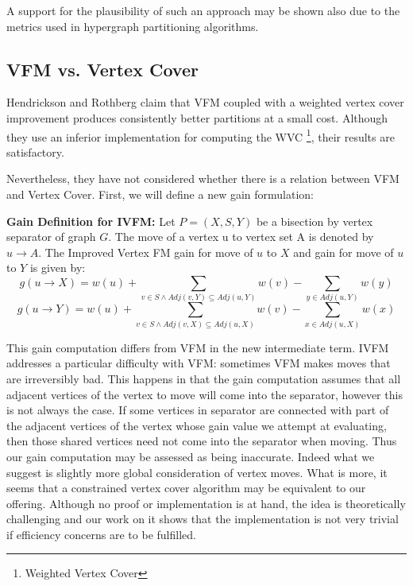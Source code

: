 \documentclass[a4paper,12pt]{article}
\begin{document}
A support for the plausibility of such an approach may be shown also
due to the metrics used in hypergraph partitioning algorithms.
\subsection{VFM vs. Vertex Cover}
Hendrickson and Rothberg claim that VFM coupled with a weighted vertex
cover improvement produces consistently better partitions at a small
cost.\cite{bend} Although they use an inferior implementation for
computing the WVC \footnote{Weighted Vertex Cover}, their results are
satisfactory.

Nevertheless, they have not considered whether there is a relation
between VFM and Vertex Cover. First, we will define a new gain
formulation:

\begin{dfn}
\textbf{Gain Definition for IVFM:} Let $P=(X,S,Y)$ be a bisection by
vertex separator of graph $G$. The move of a vertex u to vertex set A is
denoted by $u\rightarrow A$. The Improved Vertex FM gain for move
of $u$ to $X$ and gain for move of $u$ to $Y$ is given by:
\begin{equation}
g(u\rightarrow X) = w(u) +\sum_{v \in S \land Adj(v,Y) \subseteq Adj(u,Y)}{w(v)}
	 - \sum_{y \in Adj(u,Y)}{w(y)}
\end{equation}
\begin{equation}
g(u\rightarrow Y) = w(u) +\sum_{v \in S \land Adj(v,X) \subseteq Adj(u,X)}{w(v)}
	-\sum_{x \in Adj(u,X)}{w(x)}
\end{equation}
\end{dfn}

This gain computation differs from VFM in the new intermediate
term. IVFM addresses a particular difficulty with VFM: sometimes VFM
makes moves that are irreversibly bad. This happens in that the gain
computation assumes that all adjacent vertices of the vertex to move
will come into the separator, however this is not always the
case. If some vertices in separator are connected with part of the adjacent
vertices of the vertex whose gain value we attempt at evaluating, then
those shared vertices need not come into the separator when
moving. Thus our gain computation may be assessed as being
inaccurate. Indeed what we suggest is slightly more global
consideration of vertex moves. What is more, it seems that a constrained
vertex cover algorithm may be equivalent to our offering. Although no
proof or implementation is at hand, the idea is theoretically
challenging and our work on it shows that the implementation is not
very trivial if efficiency concerns are to be fulfilled.
\end{document}
